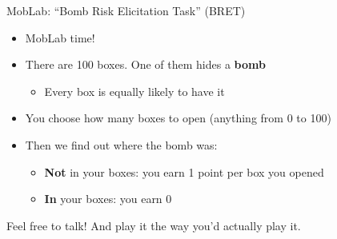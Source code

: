 \begin{frame}{MobLab: ``Bomb Risk Elicitation Task'' (BRET)}
\begin{itemize}
    \item MobLab time!
    \item There are 100 boxes. One of them hides a \textbf{bomb}
    \begin{itemize}
        \item Every box is equally likely to have it
    \end{itemize}
    \item You choose how many boxes to open (anything from 0 to 100)
    \item Then we find out where the bomb was:
    \begin{itemize}
        \item \textbf{Not} in your boxes: you earn 1 point per box you opened
        \item \textbf{In} your boxes: you earn 0
    \end{itemize}
\end{itemize}
\bsk
\vfill
\centering
Feel free to talk! And play it the way you'd actually play it.
\vspace{-0.3in}
\end{frame}


